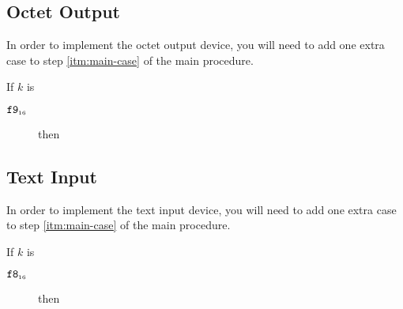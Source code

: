 \documentclass[a4paper,12pt]{article}
\newcommand{\num}[1]{\texttt{\MakeLowercase{#1}}}
\newcommand{\hex}[1]{\num{#1}_{\textup{\tiny 16}}}
\newcommand{\bitno}[2]{#1.\mathrm{bit}[#2]}
\newcommand{\range}[2]{\{#1,\ldots,#2\}}
\newcommand{\proc}[1]{\textsc{#1}}
\newcommand{\deviceio}[1]{$\langle$#1$\rangle$}
\newcommand{\op}[1]{$#1$}
\theoremstyle{definition}
\newcommand{\READCHAR}   [1]{\op{\hex{F8}}}
\newcommand{\PUTBYTE}   [1]{\op{\hex{F9}}}
\begin{document}
\subsection{Octet Output}

In order to implement the octet output device, you will need to add one extra case to step \ref{itm:main-case} of the main procedure.

\begin{stepnumbers}[start=3]
  \setcounter{enumi}{2}
\item If $k$ is
  \begin{description}
  \item[\PUTBYTE{}] then
  \end{description}
\end{stepnumbers}

\subsection{Text Input}

In order to implement the text input device, you will need to add one extra case to step \ref{itm:main-case} of the main procedure.

\begin{stepnumbers}[start=3]
  \setcounter{enumi}{2}
\item If $k$ is
  \begin{description}
  \item[\READCHAR{}] then
  \end{description}
\end{stepnumbers}
\end{document}
